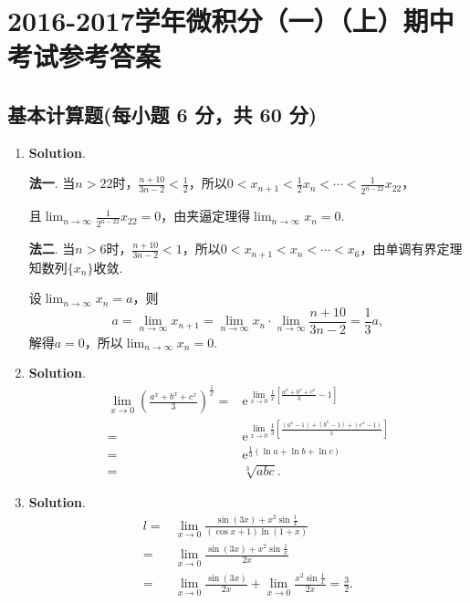 \documentclass[../main.tex]{subfiles}
\begin{document}
\chapter{2016-2017学年微积分（一）（上）期中考试参考答案}
\section{基本计算题(每小题 6 分，共 60 分)}
\begin{enumerate}
    \item \textbf{Solution}.

          \textbf{法一}. 当$n>22$时，$\frac{n+10}{3n-2}<\frac{1}{2}$，所以$0<x_{n+1}<
              \frac{1}{2}x_{n}<\cdots<\frac{1}{2^{n-22}}x_{22}$，

          且$\lim_{n\to\infty}\frac{1}{2^{n-22}}x_{22}=0$，由夹逼定理得$\lim_{n\to\infty}
              x_{n}=0$.

          \textbf{法二}. 当$n>6$时，$\frac{n+10}{3n-2}<1$，所以$0<x_{n+1}<x_{n}<\cdots
              <x_{6}$，由单调有界定理知数列$\{x_{n}\}$收敛.

          设$\lim_{n\to\infty}x_{n}=a$，则
          \[
              a=\lim_{n\to\infty}x_{n+1}=\lim_{n\to\infty}x_{n}\cdot\lim_{n\to\infty}\frac{n+10}{3n-2}
              =\frac{1}{3}a,
          \]
          解得$a=0$，所以$\lim_{n\to\infty}x_{n}=0$.

    \item \textbf{Solution}.
          \[
              \begin{aligned}
                  \lim_{x\to0}\left(\frac{a^x+b^x+c^x}{3}\right)^{\frac{1}{x}}= {} & \mathrm{e}^{\lim\limits_{x\to0}\frac{1}{x}\left[\frac{a^x+b^x+c^x}{3}-1\right]}           \\
                  = {}                                                             & \mathrm{e}^{\lim\limits_{x\to0}\frac{1}{3}\left[\frac{(a^x-1)+(b^x-1)+(c^x-1)}{x}\right]} \\
                  = {}                                                             & \mathrm{e}^{\frac{1}{3}(\ln a+\ln b+\ln c)}                                               \\
                  = {}                                                             & \sqrt[3]{abc}.
              \end{aligned}
          \]

    \item \textbf{Solution}.
          \[
              \begin{aligned}
                  l= {} & \lim_{x\to0}\frac{\sin(3x)+x^2\sin\frac{1}{x}}{(\cos x+1)\ln(1+x)}                      \\
                  = {}  & \lim_{x\to0}\frac{\sin(3x)+x^2\sin\frac{1}{x}}{2x}                                      \\
                  = {}  & \lim_{x\to0}\frac{\sin(3x)}{2x}+\lim_{x\to0}\frac{x^2\sin\frac{1}{x}}{2x}= \frac{3}{2}.
              \end{aligned}
          \]


\end{enumerate}
\end{document}
